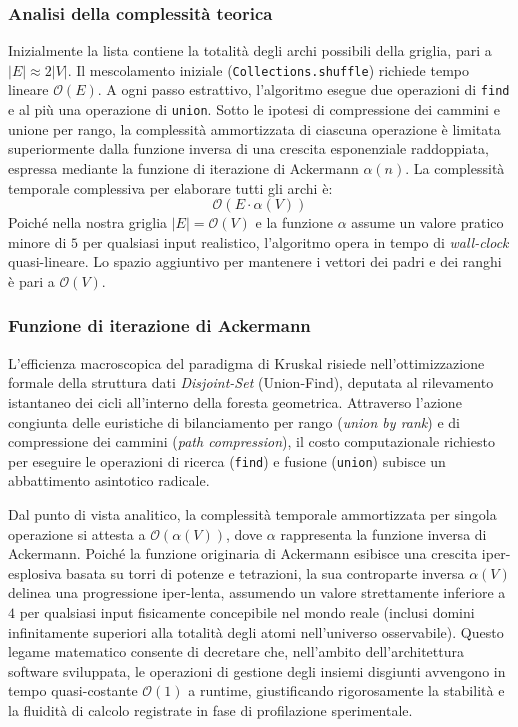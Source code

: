 \documentclass[12pt, a4paper]{article}
\begin{document}
	\subsubsection{Analisi della complessità teorica}
	Inizialmente la lista contiene la totalità degli archi possibili della griglia, pari a $|E| \approx 2|V|$. Il mescolamento iniziale (\texttt{Collections.shuffle}) richiede tempo lineare $\mathcal{O}(E)$. 
	A ogni passo estrattivo, l'algoritmo esegue due operazioni di \texttt{find} e al più una operazione di \texttt{union}. Sotto le ipotesi di compressione dei cammini e unione per rango, la complessità ammortizzata di ciascuna operazione è limitata superiormente dalla funzione inversa di una crescita esponenziale raddoppiata, espressa mediante la funzione di iterazione di Ackermann $\alpha(n)$. La complessità temporale complessiva per elaborare tutti gli archi è:
	$$\mathcal{O}(E \cdot \alpha(V))$$
	Poiché nella nostra griglia $|E| = \mathcal{O}(V)$ e la funzione $\alpha$ assume un valore pratico minore di $5$ per qualsiasi input realistico, l'algoritmo opera in tempo di \textit{wall-clock} quasi-lineare. Lo spazio aggiuntivo per mantenere i vettori dei padri e dei ranghi è pari a $\mathcal{O}(V)$.
	
	\subsubsection{Funzione di iterazione di Ackermann}
	L'efficienza macroscopica del paradigma di Kruskal risiede nell'ottimizzazione formale della struttura dati \textit{Disjoint-Set} (Union-Find), deputata al rilevamento istantaneo dei cicli all'interno della foresta geometrica. Attraverso l'azione congiunta delle euristiche di bilanciamento per rango (\textit{union by rank}) e di compressione dei cammini (\textit{path compression}), il costo computazionale richiesto per eseguire le operazioni di ricerca (\texttt{find}) e fusione (\texttt{union}) subisce un abbattimento asintotico radicale. 
	
	Dal punto di vista analitico, la complessità temporale ammortizzata per singola operazione si attesta a $\mathcal{O}(\alpha(V))$, dove $\alpha$ rappresenta la funzione inversa di Ackermann. Poiché la funzione originaria di Ackermann esibisce una crescita iper-esplosiva basata su torri di potenze e tetrazioni, la sua controparte inversa $\alpha(V)$ delinea una progressione iper-lenta, assumendo un valore strettamente inferiore a $4$ per qualsiasi input fisicamente concepibile nel mondo reale (inclusi domini infinitamente superiori alla totalità degli atomi nell'universo osservabile). Questo legame matematico consente di decretare che, nell'ambito dell'architettura software sviluppata, le operazioni di gestione degli insiemi disgiunti avvengono in tempo quasi-costante $\mathcal{O}(1)$ a runtime, giustificando rigorosamente la stabilità e la fluidità di calcolo registrate in fase di profilazione sperimentale.
	
\end{document}
